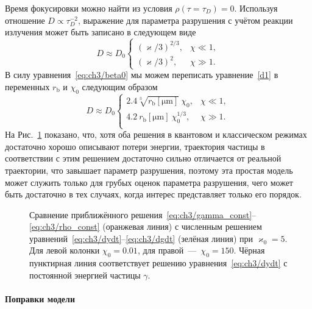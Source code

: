 Время фокусировки можно найти из условия $\rho(\tau = \tau_D) = 0 $.
Используя отношение $D\propto \tau_D^{-2}$, выражение для параметра разрушения с учётом реакции излучения может быть записано в следующем виде
\begin{equation}
    \label{eq:ch3/dratio_simple}
    D \approx D_0 
    \begin{cases}
    \left( \varkappa /3 \right)^{2/3} , & \chi \ll 1, \\
    \left( \varkappa /3 \right)^2, &  \chi \gg 1.
    \end{cases}
\end{equation}
В силу уравнения~\eqref{eq:ch3/beta0} мы можем переписать уравнение~\eqref{d1} в переменных $r_\mathrm{b}$ и $\chi_0$ следующим образом
\begin{equation}
    D \approx 
    D_0  \begin{cases}
        2.4 \sqrt[3]{r_\mathrm{b}[\si{\um}]}\ \chi_0, & \chi \ll 1, \\
        4.2 \ r_\mathrm{b}[\si{\um}]\ \chi_0^{1/3}, & \chi \gg 1. \\
    \end{cases}
\end{equation}
На Рис.~\ref{fig:ch3/sec2/motionless} показано, что, хотя оба решения в квантовом и классическом режимах достаточно хорошо описывают потери энергии, траектория частицы в соответствии с этим решением достаточно сильно отличается от реальной траектории, что завышает параметр разрушения, поэтому эта простая модель может служить только для грубых оценок параметра разрушения, чего может быть достаточно в тех случаях, когда интерес представляет только его порядок.

\begin{figure}
    \caption[Сравнение аналитического и численного решений уравнений движения частиц при столкновении пучков в режиме преобладания излучения]{\label{fig:ch3/sec2/motionless} 
    Сравнение приближённого решения~\eqref{eq:ch3/gamma_const}--\eqref{eq:ch3/rho_const} (оранжевая линия) с численным решением уравнений~\eqref{eq:ch3/dydt}--\eqref{eq:ch3/dgdt} (зелёная линия) при $\varkappa_0=5$. Для левой колонки $\chi_0=0.01$, для правой~---~$\chi_0=150$. Чёрная пунктирная линия соответствует решению уравнения~\eqref{eq:ch3/dydt} с постоянной энергией частицы $\gamma$.}
\end{figure}

\paragraph{Поправки модели}

